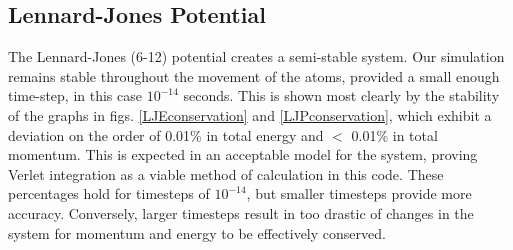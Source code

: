 \documentclass[12pt]{article}
\begin{document}
\subsection*{Lennard-Jones Potential}
The Lennard-Jones (6-12) potential creates a semi-stable system.  Our simulation remains stable throughout the movement of the atoms, provided a small enough time-step, in this case $10^{-14}$ seconds.  This is shown most clearly by the stability of the graphs in figs. \ref{LJEconservation} and \ref{LJPconservation}, which  exhibit a deviation on the order of 0.01\% in total energy and $<$ 0.01\% in total momentum.  This is expected in an acceptable model for the system, proving Verlet integration as a viable method of calculation in this code.  These percentages hold for timesteps of $10^{-14}$, but smaller timesteps provide more accuracy.  Conversely, larger timesteps result in too drastic of changes in the system for momentum and energy to be effectively conserved.
\end{document}
